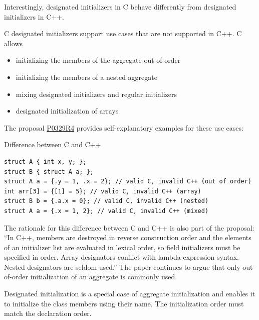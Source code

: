 Interestingly, designated initializers in C behave differently from designated initializers in C++.

\begin{tcolorbox}[colback=red!5!white,colframe=red!75!black,title={Similarity to Python}]
C designated initializers support use cases that are not supported in C++. C allows

\begin{itemize}
\item 
initializing the members of the aggregate out-of-order

\item 
initializing the members of a nested aggregate

\item 
mixing designated initializers and regular initializers

\item 
designated initialization of arrays
\end{itemize}

The proposal \href{http://www.open-std.org/jtc1/sc22/wg21/docs/papers/2017/p0329r4.pdf}{P0329R4} provides self-explanatory examples for these use cases:

\noindent
Difference between C and C++
\begin{lstlisting}[style=styleCXX]
struct A { int x, y; };
struct B { struct A a; };
struct A a = {.y = 1, .x = 2}; // valid C, invalid C++ (out of order)
int arr[3] = {[1] = 5}; // valid C, invalid C++ (array)
struct B b = {.a.x = 0}; // valid C, invalid C++ (nested)
struct A a = {.x = 1, 2}; // valid C, invalid C++ (mixed)
\end{lstlisting}

The rationale for this difference between C and C++ is also part of the proposal: “In C++, members are destroyed in reverse construction order and the elements of an initializer list are evaluated in lexical order, so field initializers must be specified in order. Array designators conflict with lambda-expression syntax. Nested designators are seldom used.” The paper continues to argue that only out-of-order initialization of an aggregate is commonly used.

\end{tcolorbox}	

\begin{tcolorbox}[colback=blue!5!white,colframe=blue!75!black,title={Distilled Information}]
Designated initialization is a special case of aggregate initialization and enables it to initialize the class members using their name. The initialization order must match the declaration order.
\end{tcolorbox}	






